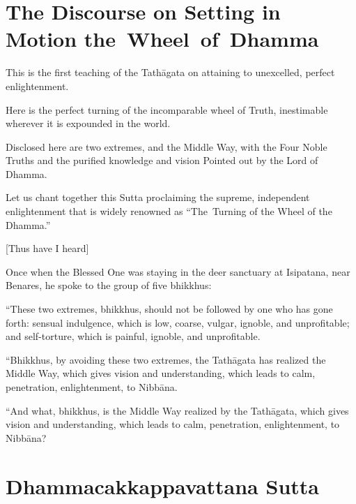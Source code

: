 
\chapter[The Wheel of Dhamma]{The Discourse on Setting in Motion the~Wheel~of~Dhamma}%

\englishText

\begin{leader}

This is the first teaching of the Tathāgata on attaining to unexcelled,
perfect enlightenment.

Here is the perfect turning of the incomparable wheel of Truth,
inestimable wherever it is expounded in the world.

Disclosed here are two extremes, and the Middle Way, with the Four Noble
Truths and the purified knowledge and vision Pointed out by the Lord of
Dhamma.

Let us chant together this Sutta proclaiming the supreme, independent
enlightenment that is widely renowned as ``The~Turning of the Wheel of
the Dhamma.''

\end{leader}

[Thus have I heard]

Once when the Blessed One was staying in the deer sanctuary at
Isipatana, near Benares, he spoke to the group of five bhikkhus:

``These two extremes, bhikkhus, should not be followed by one who has
gone forth: sensual indulgence, which is low, coarse, vulgar, ignoble,
and unprofitable; and self-torture, which is painful, ignoble, and
unprofitable.

``Bhikkhus, by avoiding these two extremes, the Tathāgata has realized
the Middle Way, which gives vision and understanding, which leads to
calm, penetration, enlightenment, to Nibbāna.

``And what, bhikkhus, is the Middle Way realized by the Tathāgata, which
gives vision and understanding, which leads to calm, penetration,
enlightenment, to Nibbāna?

\chapter{Dhammacakkappavattana Sutta}%

\paliText

